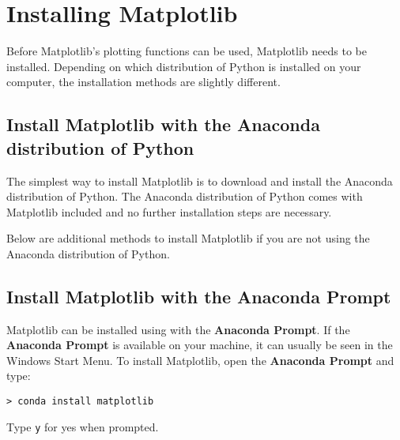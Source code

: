 \documentclass{book}
\newcommand{\passthrough}[1]{#1}
\begin{document}
    
        \hypertarget{installing-matplotlib}{%
\section{Installing Matplotlib}\label{installing-matplotlib}}
    




    
        Before Matplotlib's plotting functions can be used, Matplotlib needs to
be installed. Depending on which distribution of Python is installed on
your computer, the installation methods are slightly different.
    




    
        \hypertarget{install-matplotlib-with-the-anaconda-distribution-of-python}{%
\subsection{Install Matplotlib with the Anaconda distribution of
Python}\label{install-matplotlib-with-the-anaconda-distribution-of-python}}

The simplest way to install Matplotlib is to download and install the
Anaconda distribution of Python. The Anaconda distribution of Python
comes with Matplotlib included and no further installation steps are
necessary.

Below are additional methods to install Matplotlib if you are not using
the Anaconda distribution of Python.
    




    
        \hypertarget{install-matplotlib-with-the-anaconda-prompt}{%
\subsection{Install Matplotlib with the Anaconda
Prompt}\label{install-matplotlib-with-the-anaconda-prompt}}

Matplotlib can be installed using with the \textbf{Anaconda Prompt}. If
the \textbf{Anaconda Prompt} is available on your machine, it can
usually be seen in the Windows Start Menu. To install Matplotlib, open
the \textbf{Anaconda Prompt} and type:

\begin{lstlisting}
> conda install matplotlib
\end{lstlisting}

Type \passthrough{\lstinline!y!} for yes when prompted.
    
\end{document}
